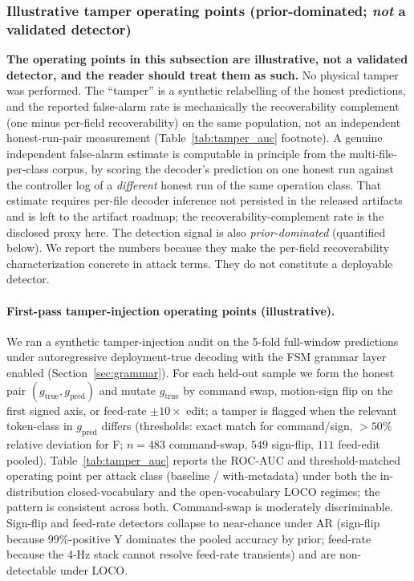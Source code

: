 \documentclass[sensors,article,submit,moreauthors,pdftex]{Definitions/mdpi}
\begin{document}
\subsubsection*{Illustrative tamper operating points (prior-dominated; \emph{not} a validated detector)}
\label{sec:disc-tamper-illustrative}

\noindent\textbf{The operating points in this subsection are illustrative, not a validated detector, and the reader should treat them as such.} No physical tamper was performed. The ``tamper'' is a synthetic relabelling of the honest predictions, and the reported false-alarm rate is mechanically the recoverability complement (one minus per-field recoverability) on the same population, not an independent honest-run-pair measurement (Table~\ref{tab:tamper_auc} footnote). A genuine independent false-alarm estimate is computable in principle from the multi-file-per-class corpus, by scoring the decoder's prediction on one honest run against the controller log of a \emph{different} honest run of the same operation class. That estimate requires per-file decoder inference not persisted in the released artifacts and is left to the artifact roadmap; the recoverability-complement rate is the disclosed proxy here. The detection signal is also \emph{prior-dominated} (quantified below). We report the numbers because they make the per-field recoverability characterization concrete in attack terms. They do not constitute a deployable detector.

\paragraph{First-pass tamper-injection operating points (illustrative).} We ran a synthetic tamper-injection audit on the 5-fold full-window predictions under autoregressive deployment-true decoding with the FSM grammar layer enabled (Section~\ref{sec:grammar}). For each held-out sample we form the honest pair $(g_{\text{true}}, g_{\text{pred}})$ and mutate $g_{\text{true}}$ by command swap, motion-sign flip on the first signed axis, or feed-rate $\pm 10\times$ edit; a tamper is flagged when the relevant token-class in $g_{\text{pred}}$ differs (thresholds: exact match for command/sign, $>50\%$ relative deviation for F; $n\!=\!483$ command-swap, $549$ sign-flip, $111$ feed-edit pooled). Table~\ref{tab:tamper_auc} reports the ROC-AUC and threshold-matched operating point per attack class (baseline / with-metadata) under both the in-distribution closed-vocabulary and the open-vocabulary LOCO regimes; the pattern is consistent across both. Command-swap is moderately discriminable. Sign-flip and feed-rate detectors collapse to near-chance under AR (sign-flip because $99\%$-positive Y dominates the pooled accuracy by prior; feed-rate because the 4-Hz stack cannot resolve feed-rate transients) and are non-detectable under LOCO.
\end{document}
